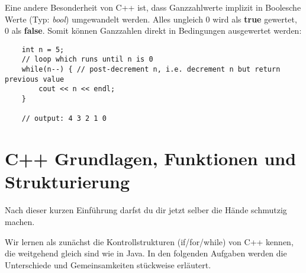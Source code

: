 Eine andere Besonderheit von C++ ist, dass Ganzzahlwerte implizit in Boolesche Werte (Typ: \emph{bool}) umgewandelt werden.
Alles ungleich 0 wird als \textbf{true} gewertet, 0 als \textbf{false}.
Somit können Ganzzahlen direkt in Bedingungen ausgewertet werden:

\begin{lstlisting}
 	int n = 5;
 	// loop which runs until n is 0
 	while(n--) { // post-decrement n, i.e. decrement n but return previous value
  		cout << n << endl;
 	}

	// output: 4 3 2 1 0
\end{lstlisting}


\section{C++ Grundlagen, Funktionen und Strukturierung}

Nach dieser kurzen Einführung darfst du dir jetzt selber die Hände schmutzig machen.

Wir lernen als zunächst die Kontrollstrukturen (if/for/while) von C++ kennen, die weitgehend gleich sind wie in Java.
In den folgenden Aufgaben werden die Unterschiede und Gemeinsamkeiten stückweise erläutert.

